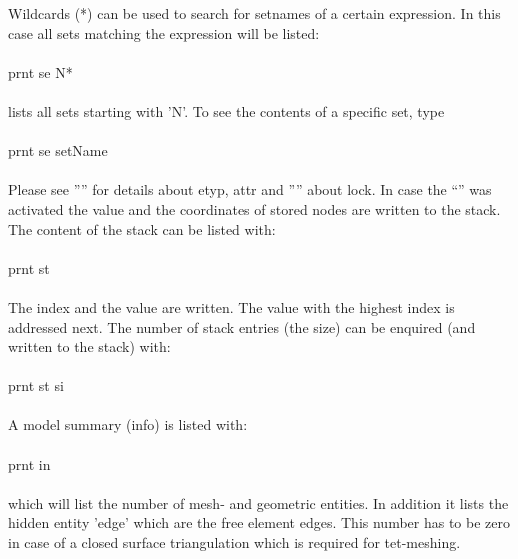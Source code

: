 \documentclass{article}
\begin{document}
Wildcards (*) can be used to search for setnames of a certain expression. In this case all sets matching the expression will be listed:\\\\prnt se N*\\\\lists all sets starting with 'N'. To see the contents of a specific set, type\\\\prnt se setName\\\\Please see '''' for details about etyp, attr and '''' about lock. In case the ``'' was activated the value and the coordinates of stored nodes are written to the stack. The content of the stack can be listed with:\\\\prnt st\\\\The index and the value are written. The value with the highest index is addressed next. The number of stack entries (the size) can be enquired (and written to the stack) with:\\\\prnt st si\\\\A model summary (info) is listed with:\\\\prnt in\\\\which will list the number of mesh- and geometric entities. In addition it lists the hidden entity 'edge' which are the free element edges. This number has to be zero in case of a closed surface triangulation which is required for tet-meshing.
\end{document}

